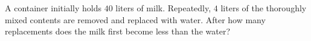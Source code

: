A container initially holds $40$ liters of milk. Repeatedly, $4$ liters of the thoroughly mixed contents are removed and replaced with water. After how many replacements does the milk first become less than the water?
